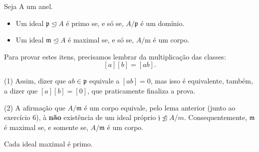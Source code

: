\documentclass[../algebraIII_notes.tex]{subfiles}
\begin{document}
\begin{lemma*}
	Seja A um anel.
	\begin{itemize}
		\item[1)] Um ideal \(\mathfrak{p}\trianglelefteq A\) é primo se, e só se, \(A/\mathfrak{p}\) é um domínio.
		\item[2)] Um ideal \(\mathfrak{m}\trianglelefteq A\) é maximal se, e só se, \(A/\mathrm{m}\) é um corpo.
	\end{itemize}
\end{lemma*}
\begin{proof*}
	Para provar estes itens, precisamos lembrar da multiplicação das classes:
	\[
		[a][b]=[ab].
	\]

	(1) Assim, dizer que \(ab\in \mathfrak{p}\) equivale a \([ab]=0\), mas isso é equivalente, também, a dizer que \([a][b]=[0]\), que praticamente finaliza a prova.

	(2) A afirmação que \(A/\mathfrak{m}\) é um corpo equivale, pelo lema anterior (junto ao exercício 6), à \textbf{não} existência de um ideal próprio \(\mathfrak{j}\not\trianglelefteq A/m\). Consequentemente, \(\mathfrak{m}\) é maximal se, e somente se, \(A/\mathfrak{m}\) é um corpo. \qedsymbol
\end{proof*}
\begin{tcolorbox}[
		skin=enhanced,
		title=Observação,
		fonttitle=\bfseries,
		colframe=black,
		colbacktitle=cyan!75!white,
		colback=cyan!15,
		colbacklower=black,
		coltitle=black,
		drop fuzzy shadow,
	]
	Cada ideal maximal é primo.
\end{tcolorbox}
\end{document}
